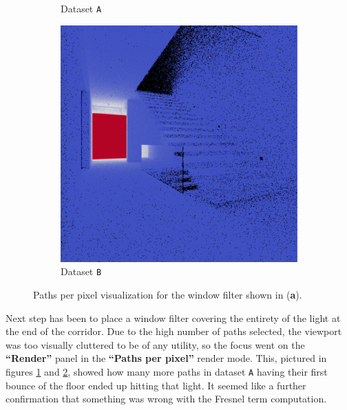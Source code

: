 \begin{figure}
\begin{subfigure}[t]{0.32\linewidth}
		\caption{Dataset \texttt{A}}
		\label{correct2ppp}
	\end{subfigure}
	\begin{subfigure}[t]{0.32\linewidth}
		\includegraphics[width=\textwidth]{chapters/chapter_results/wrong2ppp}
		\caption{Dataset \texttt{B}}
		\label{wrong2ppp}
	\end{subfigure}

	\caption{Paths per pixel visualization for the window filter shown in (\textbf{a}).}
	\label{couple2ppp}
\end{figure}

Next step has been to place a window filter covering the entirety of the light at the end of the corridor. Due to the high number of paths selected, the viewport was too visually cluttered to be of any utility, so the focus went on the \textbf{“Render”} panel in the \textbf{“Paths per pixel”} render mode. This, pictured in figures \ref{correct2ppp} and \ref{wrong2ppp}, showed how many more paths in dataset \texttt{A} having their first bounce of the floor ended up hitting that light. It seemed like a further confirmation that something was wrong with the Fresnel term computation.

